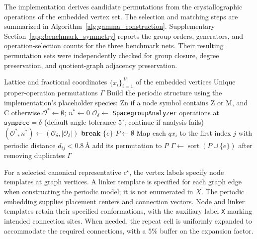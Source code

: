 \documentclass[a5paper, 10pt]{article}
\begin{document}
The implementation derives candidate permutations from the crystallographic operations of the embedded vertex set. The selection and matching steps are summarized in Algorithm~\ref{alg:gamma_construction}. Supplementary Section~\ref{app:benchmark_symmetry} reports the group orders, generators, and operation-selection counts for the three benchmark nets. Their resulting permutation sets were independently checked for group closure, degree preservation, and quotient-graph adjacency preservation.

\begin{algorithm}[htbp]
\caption{Numerical construction of the embedded-net permutation group}
\label{alg:gamma_construction}
\scriptsize
\begin{algorithmic}[1]
\Require Lattice and fractional coordinates $\{x_i\}_{i=1}^{|V|}$ of the embedded vertices
\Ensure Unique proper-operation permutations $\Gamma$
\State Build the periodic structure using the implementation's placeholder species: Zn if a node symbol contains Z or M, and C otherwise
\State $\mathcal{O}^*\gets\emptyset$; $n^*\gets0$
    \State $\mathcal{O}_{\delta}\gets$ \texttt{SpacegroupAnalyzer} operations at $\texttt{symprec}=\delta$ (default angle tolerance $5^\circ$; continue if analysis fails)
        \State $(\mathcal{O}^*,n^*)\gets(\mathcal{O}_{\delta},|\mathcal{O}_{\delta}|)$
    \EndIf
     \State \textbf{break} \EndIf
\EndFor
{} \State \Return $\{e\}$ \EndIf
\State $P\gets\emptyset$
    \State Map each $q x_i$ to the first index $j$ with periodic distance $d_{ij}<0.8\,\text{\AA}$
     \State add its permutation to $P$ \EndIf
\EndFor
\State $\Gamma\gets\operatorname{sort}(P\cup\{e\})$ after removing duplicates
\State \Return $\Gamma$
\end{algorithmic}
\end{algorithm}

For a selected canonical representative $c^\star$, the vertex labels specify node templates at graph vertices. A linker template is specified for each graph edge when constructing the periodic model; it is not enumerated in $X$. The periodic embedding supplies placement centers and connection vectors. Node and linker templates retain their specified conformations, with the auxiliary label \texttt{X} marking intended connection sites. When needed, the repeat cell is uniformly expanded to accommodate the required connections, with a 5\% buffer on the expansion factor.
\end{document}
